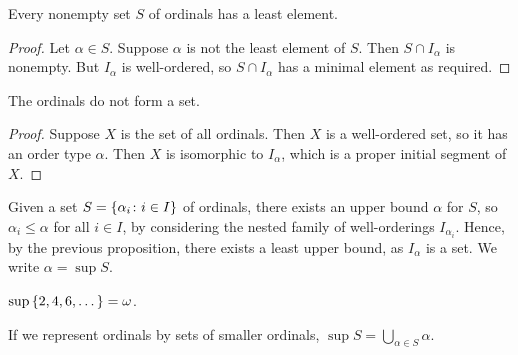 \begin{proposition}
    Every nonempty set \( S \) of ordinals has a least element.
\end{proposition}
\begin{proof}
    Let \( \alpha \in S \).
    Suppose \( \alpha \) is not the least element of \( S \).
    Then \( S \cap I_\alpha \) is nonempty.
    But \( I_\alpha \) is well-ordered, so \( S \cap I_\alpha \) has a minimal element as required.
\end{proof}
\begin{theorem}
    The ordinals do not form a set.
\end{theorem}
\begin{proof}
    Suppose \( X \) is the set of all ordinals.
    Then \( X \) is a well-ordered set, so it has an order type \( \alpha \).
    Then \( X \) is isomorphic to \( I_\alpha \), which is a proper initial segment of \( X \).
\end{proof}
\begin{remark}
    Given a set \( S = \qty{\alpha_i \colon i \in I} \) of ordinals, there exists an upper bound \( \alpha \) for \( S \), so \( \alpha_i \leq \alpha \) for all \( i \in I \), by considering the nested family of well-orderings \( I_{\alpha_i} \).
    Hence, by the previous proposition, there exists a least upper bound, as \( I_\alpha \) is a set.
    We write \( \alpha = \sup S \).
\end{remark}
\begin{example}
    \( \sup \qty{2, 4, 6, \dots} = \omega \).
\end{example}
\begin{remark}
    If we represent ordinals by sets of smaller ordinals, \( \sup S = \bigcup_{\alpha \in S} \alpha \).
\end{remark}

